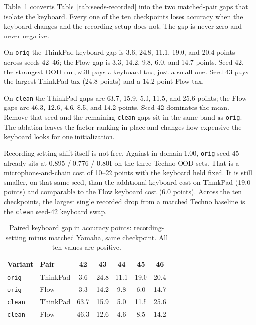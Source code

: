 \documentclass[pdflatex,sn-mathphys-num,iicol]{sn-jnl}
\theoremstyle{thmstyleone}
\theoremstyle{thmstyletwo}
\theoremstyle{thmstylethree}
\begin{document}
Table~\ref{tab:paired} converts Table~\ref{tab:seeds-recorded} into the two matched-pair gaps that isolate the keyboard. Every one of the ten checkpoints loses accuracy when the keyboard changes and the recording setup does not. The gap is never zero and never negative.

On \texttt{orig} the ThinkPad keyboard gap is 3.6, 24.8, 11.1, 19.0, and 20.4 points across seeds 42--46; the Flow gap is 3.3, 14.2, 9.8, 6.0, and 14.7 points. Seed 42, the strongest OOD run, still pays a keyboard tax, just a small one. Seed 43 pays the largest ThinkPad tax (24.8 points) and a 14.2-point Flow tax.

On \texttt{clean} the ThinkPad gaps are 63.7, 15.9, 5.0, 11.5, and 25.6 points; the Flow gaps are 46.3, 12.6, 4.6, 8.5, and 14.2 points. Seed 42 dominates the mean. Remove that seed and the remaining \texttt{clean} gaps sit in the same band as \texttt{orig}. The ablation leaves the factor ranking in place and changes how expensive the keyboard looks for one initialization.

Recording-setting shift itself is not free. Against in-domain 1.00, \texttt{orig} seed 45 already sits at 0.895 / 0.776 / 0.801 on the three Techno OOD sets. That is a microphone-and-chain cost of 10--22 points with the keyboard held fixed. It is still smaller, on that same seed, than the additional keyboard cost on ThinkPad (19.0 points) and comparable to the Flow keyboard cost (6.0 points). Across the ten checkpoints, the largest single recorded drop from a matched Techno baseline is the \texttt{clean} seed-42 keyboard swap.

\begin{table}[htbp]
\caption{Paired keyboard gap in accuracy points: recording-setting minus matched Yamaha, same checkpoint. All ten values are positive.}\label{tab:paired}
\setlength{\tabcolsep}{3.5pt}
\begin{tabular}{@{}llccccc@{}}
\toprule
Variant & Pair & 42 & 43 & 44 & 45 & 46 \\
\midrule
\texttt{orig} & ThinkPad & 3.6 & 24.8 & 11.1 & 19.0 & 20.4 \\
\texttt{orig} & Flow & 3.3 & 14.2 & 9.8 & 6.0 & 14.7 \\
\texttt{clean} & ThinkPad & 63.7 & 15.9 & 5.0 & 11.5 & 25.6 \\
\texttt{clean} & Flow & 46.3 & 12.6 & 4.6 & 8.5 & 14.2 \\
\bottomrule
\end{tabular}
\end{table}
\end{document}

